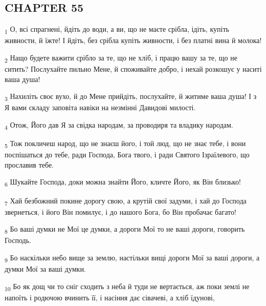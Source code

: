 \subsection{CHAPTER 55}
\begin{tcolorbox}
\textsubscript{1} О, всі спрагнені, йдіть до води, а ви, що не маєте срібла, ідіть, купіть живности, й їжте! І йдіть, без срібла купіть живности, і без платні вина й молока!
\end{tcolorbox}
\begin{tcolorbox}
\textsubscript{2} Нащо будете важити срібло за те, що не хліб, і працю вашу за те, що не ситить? Послухайте пильно Мене, й споживайте добро, і нехай розкошує у наситі ваша душа!
\end{tcolorbox}
\begin{tcolorbox}
\textsubscript{3} Нахиліть своє вухо, й до Мене прийдіть, послухайте, й житиме ваша душа! І з Я вами складу заповіта навіки на незмінні Давидові милості.
\end{tcolorbox}
\begin{tcolorbox}
\textsubscript{4} Отож, Його дав Я за свідка народам, за проводиря та владику народам.
\end{tcolorbox}
\begin{tcolorbox}
\textsubscript{5} Тож покличеш народ, що не знаєш його, і той люд, що не знає тебе, і вони поспішаться до тебе, ради Господа, Бога твого, і ради Святого Ізраїлевого, що прославив тебе.
\end{tcolorbox}
\begin{tcolorbox}
\textsubscript{6} Шукайте Господа, доки можна знайти Його, кличте Його, як Він близько!
\end{tcolorbox}
\begin{tcolorbox}
\textsubscript{7} Хай безбожний покине дорогу свою, а крутій свої задуми, і хай до Господа звернеться, і його Він помилує, і до нашого Бога, бо Він пробачає багато!
\end{tcolorbox}
\begin{tcolorbox}
\textsubscript{8} Бо ваші думки не Мої це думки, а дороги Мої то не ваші дороги, говорить Господь.
\end{tcolorbox}
\begin{tcolorbox}
\textsubscript{9} Бо наскільки небо вище за землю, настільки вищі дороги Мої за ваші дороги, а думки Мої за ваші думки.
\end{tcolorbox}
\begin{tcolorbox}
\textsubscript{10} Бо як дощ чи то сніг сходить з неба й туди не вертається, аж поки землі не напоїть і родючою вчинить її, і насіння дає сівачеві, а хліб їдунові,
\end{tcolorbox}
